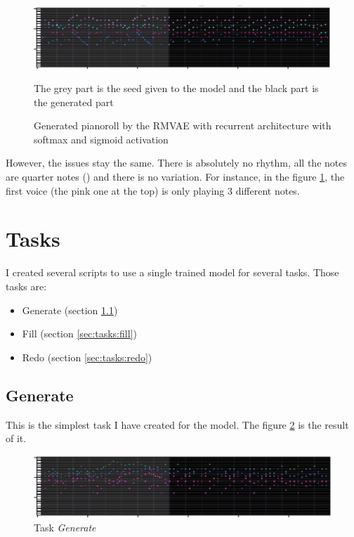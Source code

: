 \documentclass[12pt]{report}
\begin{document}
\begin{figure}[htbp]
    \centering
    \includegraphics[width=\textwidth]{images/generated_midis/RRMVAE/pianoroll-rrmvae-with-binary.jpg}
    \caption{Generated pianoroll by the RMVAE with recurrent architecture with softmax and sigmoid activation}
    The grey part is the seed given to the model and the black part is the generated part
    \label{fig:pianoroll:rrmvae:with-binary}
\end{figure}

However, the issues stay the same.
There is absolutely no rhythm, all the notes are quarter notes (\musQuarter) and there is no variation.
For instance, in the figure \ref{fig:pianoroll:rrmvae:with-binary}, the first voice (the pink one at the top) is only playing 3 different notes.

\section{Tasks}
\label{sec:tasks}

I created several scripts to use a single trained model for several tasks.
Those tasks are:
\begin{itemize}
    \item Generate (section \ref{sec:tasks:generate})
    \item Fill (section \ref{sec:tasks:fill})
    \item Redo (section \ref{sec:tasks:redo})
\end{itemize}


\subsection{Generate}
\label{sec:tasks:generate}

This is the simplest task I have created for the model.
The figure \ref{fig:tasks:generate} is the result of it.

\begin{figure}[htbp]
    \centering
    \includegraphics[width=\textwidth]{images/generated_midis/tasks/generate/generate.jpg}
    \caption{Task \textit{Generate}}
    \label{fig:tasks:generate}
\end{figure}
\end{document}
